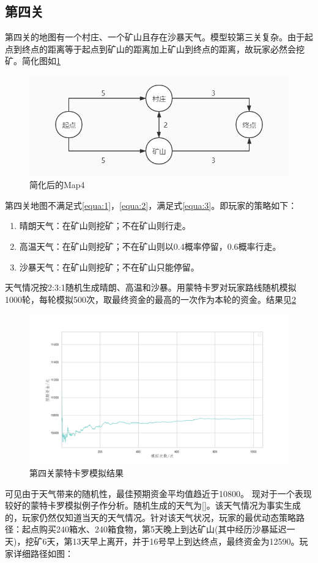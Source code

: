 \documentclass[withoutpre]{cumcmthesis} %
\begin{document}
\subsection{第四关}
第四关的地图有一个村庄、一个矿山且存在沙暴天气。模型较第三关复杂。由于起点到终点的距离等于起点到矿山的距离加上矿山到终点的距离，故玩家必然会挖矿。简化图如\cref{fig:map4}
\begin{figure}[H]
    \centering
    \includegraphics[scale=0.5]{figures/map4.jpg}
    \caption{简化后的Map4}
    \label{fig:map4}
\end{figure}

第四关地图不满足式\cref{equa:1}，\cref{equa:2}，满足式\cref{equa:3}。即玩家的策略如下：
\begin{enumerate}
    \item 晴朗天气：在矿山则挖矿；不在矿山则行走。
    \item 高温天气：在矿山则挖矿；不在矿山则以0.4概率停留，0.6概率行走。
    \item 沙暴天气：在矿山则挖矿；不在矿山只能停留。
\end{enumerate}
天气情况按2:3:1随机生成晴朗、高温和沙暴。用蒙特卡罗对玩家路线随机模拟1000轮，每轮模拟500次，取最终资金的最高的一次作为本轮的资金。结果见\cref{fig:check4}
\begin{figure}[H]
    \centering
    \includegraphics[scale=0.5]{figures/check4.png}
    \caption{第四关蒙特卡罗模拟结果}
    \label{fig:check4}
\end{figure}
可见由于天气带来的随机性，最佳预期资金平均值趋近于10800。
现对于一个表现较好的蒙特卡罗模拟例子作分析。随机生成的天气为[]。该天气情况为事实生成的，玩家仍然仅知道当天的天气情况。针对该天气状况，玩家的最优动态策略路径：起点购买240箱水、240箱食物，第5天晚上到达矿山(其中经历沙暴延迟一天)，挖矿6天，第13天早上离开，并于16号早上到达终点，最终资金为12590。玩家详细路径如图：
\end{document}
